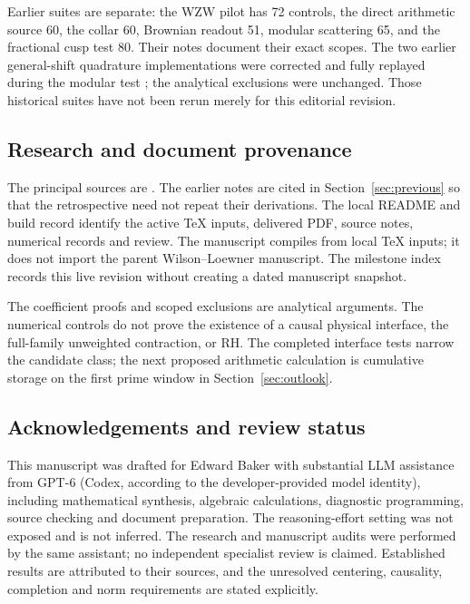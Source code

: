 Earlier suites are separate: the WZW pilot has 72 controls, the direct
arithmetic source 60, the collar 60, Brownian readout 51, modular
scattering 65, and the fractional cusp test 80. Their notes document
their exact scopes. The two earlier general-shift quadrature
implementations were corrected and fully replayed during the modular
test \cite[Section~8]{ModularNote}; the analytical exclusions were
unchanged. Those historical suites have not been rerun merely for
this editorial revision.

\subsection{Research and document provenance}

The principal sources are \cite{OrbitNote,InterfaceNote,BoundaryNote}.
The earlier notes are cited in Section~\ref{sec:previous} so that the
retrospective need not repeat their derivations. The local README and
build record identify the active TeX inputs, delivered PDF, source
notes, numerical records and review. The manuscript compiles from
local TeX inputs; it does not import the parent Wilson--Loewner
manuscript. The milestone index records this live revision without
creating a dated manuscript snapshot.

The coefficient proofs and scoped exclusions are analytical arguments.
The numerical controls do not prove the existence of a causal physical
interface, the full-family unweighted contraction, or RH. The completed interface tests narrow the candidate class; the
next proposed arithmetic calculation is cumulative storage on the first
prime window in Section~\ref{sec:outlook}.

\subsection{Acknowledgements and review status}

This manuscript was drafted for Edward Baker with substantial LLM
assistance from GPT-6 (Codex, according to the developer-provided model
identity), including mathematical synthesis, algebraic calculations,
diagnostic programming, source checking and document preparation.
The reasoning-effort setting was not exposed and is not inferred.
The research and manuscript audits were performed by the same
assistant; no independent specialist review is claimed. Established
results are attributed to their sources, and the unresolved centering,
causality, completion and norm requirements are stated explicitly.
